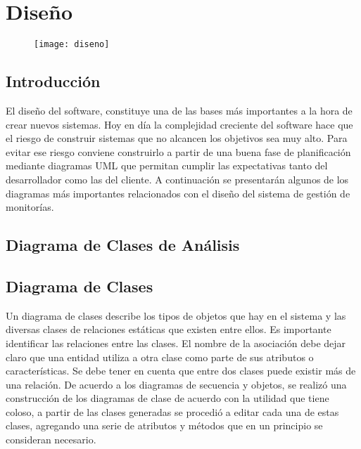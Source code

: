 \chapter{Diseño}
\begin{figure}[H]
	\centering
	\texttt{[image: diseno]}
    \centering
\end{figure}
\section{Introducción}

El diseño del software, constituye una de las bases más importantes a la hora de crear nuevos sistemas. Hoy en día la complejidad creciente del software hace que el riesgo de construir sistemas que no alcancen los objetivos sea muy alto. Para evitar ese riesgo conviene construirlo a partir de una buena fase de planificación mediante diagramas UML que permitan cumplir las expectativas tanto del desarrollador como las del cliente. A continuación se presentarán algunos de los diagramas más importantes relacionados con el diseño del sistema de gestión de monitorías.

\newpage

\section{Diagrama de Clases de Análisis}

\newpage

\section{Diagrama de Clases}

Un diagrama de clases describe los tipos de objetos que hay en el sistema y las diversas clases de relaciones estáticas que existen entre ellos.
Es importante identificar las relaciones entre las clases. El nombre de la asociación debe dejar claro que una entidad utiliza a otra clase como parte de sus atributos o características. Se debe tener en cuenta que entre dos clases puede existir más de una relación.\cite{Sergio_2015}
\newline
De acuerdo a los diagramas de secuencia y objetos, se realizó una construcción de los diagramas de clase de acuerdo con la utilidad que tiene coloso, a partir de las clases generadas se procedió a editar cada una de estas clases, agregando una serie de atributos y métodos que en un principio se consideran necesario.

